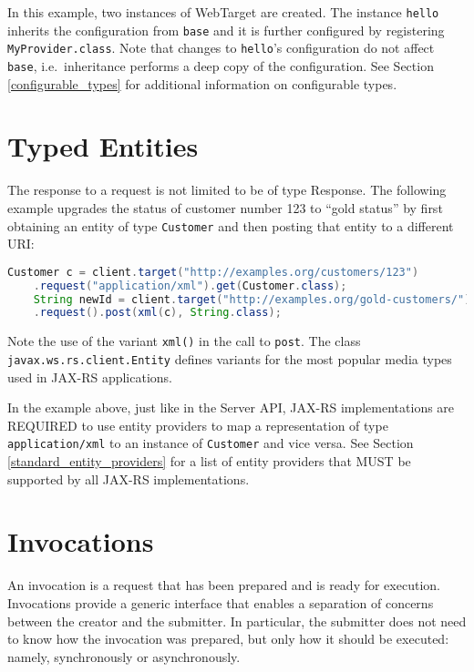 In this example, two instances of WebTarget are created. The instance \lstinline{hello} inherits the configuration from
\lstinline{base} and it is further configured by registering \lstinline{MyProvider.class}. Note that changes to
\lstinline{hello}'s configuration do not affect \lstinline{base}, i.e.~inheritance performs a deep copy of the
configuration. See Section \ref{configurable_types} for additional information on configurable types.

\section{Typed Entities}

The response to a request is not limited to be of type Response. The following example upgrades the status of customer
number 123 to ``gold status'' by first obtaining an entity of type \lstinline{Customer} and then posting that entity to
a different URI:

\begin{lstlisting}[language=Java]
    Customer c = client.target("http://examples.org/customers/123")
    .request("application/xml").get(Customer.class);
    String newId = client.target("http://examples.org/gold-customers/")
    .request().post(xml(c), String.class);
\end{lstlisting}

Note the use of the variant \lstinline{xml()} in the call to \lstinline{post}. The class
\lstinline{javax.ws.rs.client.Entity} defines variants for the most popular media types used in JAX-RS applications.

In the example above, just like in the Server API, JAX-RS implementations are REQUIRED to use entity providers to map a
representation of type \lstinline{application/xml} to an instance of \lstinline{Customer} and vice versa. See Section
\ref{standard_entity_providers} for a list of entity providers that MUST be supported by all JAX-RS implementations.

\section{Invocations}
\label{invocations}

An invocation is a request that has been prepared and is ready for execution. Invocations provide a generic interface
that enables a separation of concerns between the creator and the submitter. In particular, the submitter does not need
to know how the invocation was prepared, but only how it should be executed: namely, synchronously or asynchronously.

